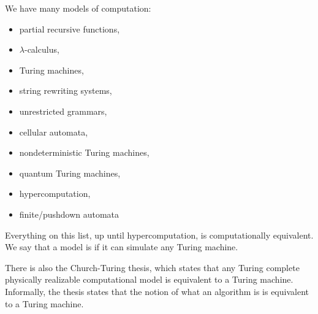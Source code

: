 We have many models of computation:
\begin{itemize}
\item partial recursive functions,
\item $\lambda$-calculus,
\item Turing machines,
\item string rewriting systems,
\item unrestricted grammars,
\item cellular automata,
\item nondeterministic Turing machines,
\item quantum Turing machines,
\item hypercomputation,
\item finite/pushdown automata
\end{itemize}
Everything on this list, up until hypercomputation, is computationally
equivalent.
We say that a model is  if it can simulate any Turing
machine.

There is also the Church-Turing thesis, which states that any Turing complete
physically realizable computational model is equivalent to a Turing machine.
Informally, the thesis states that the notion of what an algorithm is is
equivalent to a Turing machine.

